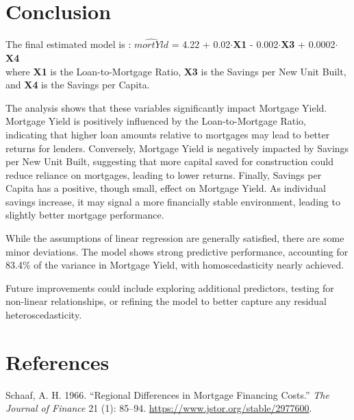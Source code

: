 \documentclass[
  12pt,
]{article}
\newlength{\cslhangindent}
\newenvironment{CSLReferences}[2] %
 {\begin{list}{}{%
  \setlength{\itemindent}{0pt}
  \setlength{\leftmargin}{0pt}
  \setlength{\parsep}{0pt}
  \ifodd #1
   \setlength{\leftmargin}{\cslhangindent}
   \setlength{\itemindent}{-1\cslhangindent}
  \fi
  \setlength{\itemsep}{#2\baselineskip}}}
 {\end{list}}
\begin{document}
\section{Conclusion}\label{conclusion}

The final estimated model is : \(\hat{mortYld}\) = 4.22 +
0.02\(\cdot\)\textbf{X1} - 0.002\(\cdot\)\textbf{X3} +
0.0002\(\cdot\)\textbf{X4}\\
where \textbf{X1} is the Loan-to-Mortgage Ratio, \textbf{X3} is the
Savings per New Unit Built, and \textbf{X4} is the Savings per Capita.

The analysis shows that these variables significantly impact Mortgage
Yield. Mortgage Yield is positively influenced by the Loan-to-Mortgage
Ratio, indicating that higher loan amounts relative to mortgages may
lead to better returns for lenders. Conversely, Mortgage Yield is
negatively impacted by Savings per New Unit Built, suggesting that more
capital saved for construction could reduce reliance on mortgages,
leading to lower returns. Finally, Savings per Capita has a positive,
though small, effect on Mortgage Yield. As individual savings increase,
it may signal a more financially stable environment, leading to slightly
better mortgage performance.

While the assumptions of linear regression are generally satisfied,
there are some minor deviations. The model shows strong predictive
performance, accounting for 83.4\% of the variance in Mortgage Yield,
with homoscedasticity nearly achieved.

Future improvements could include exploring additional predictors,
testing for non-linear relationships, or refining the model to better
capture any residual heteroscedasticity.

\section*{References}\label{references}

\label{refs}
\begin{CSLReferences}{1}{0}
Schaaf, A. H. 1966. {``Regional Differences in Mortgage Financing
Costs.''} \emph{The Journal of Finance} 21 (1): 85--94.
\url{https://www.jstor.org/stable/2977600}.

\end{CSLReferences}
\end{document}
